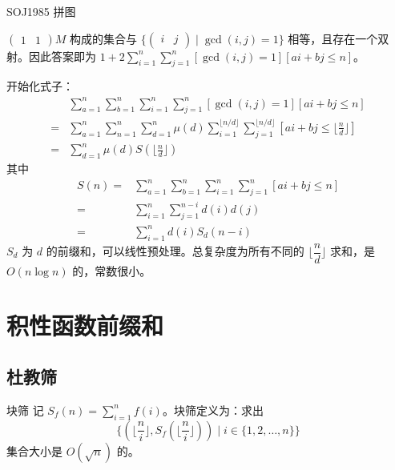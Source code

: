 \documentclass [hyperref={bookmarksdepth=4}, aspectratio=169] {beamer}
\theoremstyle {fy}
\begin{document}
\begin{frame}{SOJ1985 拼图}
\begin{itemize}
  $\begin{pmatrix}1 & 1\end{pmatrix}M$ 构成的集合与 $\{\begin{pmatrix}i & j\end{pmatrix}\mid \gcd(i,j)=1\}$ 相等，且存在一个双射。因此答案即为 $1+2\sum\limits_{i=1}^n\sum\limits_{j=1}^n[\gcd(i,j)=1][ai+bj\le n]$。
\end{itemize}

开始化式子：
$$
\begin{aligned}
&\sum_{a=1}^n\sum_{b=1}^n\sum_{i=1}^n\sum_{j=1}^n[\gcd(i,j)=1][ai+bj\le n]\\
=&\sum_{a=1}^n\sum_{n=1}^n\sum_{d=1}^n\mu(d)\sum_{i=1}^{\lfloor n/d\rfloor}\sum_{j=1}^{\lfloor n/d\rfloor}[ai+bj\le \lfloor \frac{n}{d}\rfloor]\\
=&\sum_{d=1}^n\mu(d)S(\lfloor\frac{n}{d}\rfloor)
\end{aligned}
$$
其中
$$
\begin{aligned}
S(n)=&\sum_{a=1}^n\sum_{b=1}^n\sum_{i=1}^n\sum_{j=1}^n[ai+bj\le n]\\
=&\sum_{i=1}^n\sum_{j=1}^{n-i}d(i)d(j)\\
=&\sum_{i=1}^nd(i)S_d(n-i)
\end{aligned}
$$
$S_d$ 为 $d$ 的前缀和，可以线性预处理。总复杂度为所有不同的 $\lfloor\dfrac{n}{d}\rfloor$ 求和，是 $O(n\log n)$ 的，常数很小。
\end{frame}

\section{积性函数前缀和}

\subsection{杜教筛}

\begin{frame}{块筛}
记 $S_f(n)=\sum\limits_{i=1}^nf(i)$。块筛定义为：求出
$$
\{(\lfloor\frac{n}{i}\rfloor,S_f(\lfloor\frac{n}{i}\rfloor))\mid i\in\{1,2,\dots,n\} \}
$$
集合大小是 $O(\sqrt n)$ 的。
\end{frame}
\end{document}
